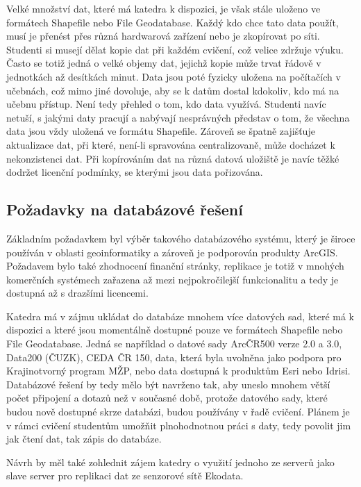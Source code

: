 Velké množství dat, které má katedra k dispozici, je však stále uloženo ve formátech Shapefile nebo File Geodatabase. Každý kdo chce tato data použít, musí je přenést přes různá hardwarová zařízení nebo je zkopírovat po síti. Studenti si musejí dělat kopie dat při každém cvičení, což velice zdržuje výuku. Často se totiž jedná o velké objemy dat, jejichž kopie může trvat řádově v jednotkách až desítkách minut. Data jsou poté fyzicky uložena na počítačích v učebnách, což mimo jiné dovoluje, aby se k datům dostal kdokoliv, kdo má na učebnu přístup. Není tedy přehled o tom, kdo data využívá. Studenti navíc netuší, s jakými daty pracují a nabývají nesprávných představ o tom, že všechna data jsou vždy uložená ve formátu Shapefile. Zároveň se špatně zajišťuje aktualizace dat, při které, není-li spravována centralizovaně, může docházet k nekonzistenci dat. Při kopírováním dat na různá datová uložiště je navíc těžké dodržet licenční podmínky, se kterými jsou data pořizována. 

\subsection{Požadavky na databázové řešení}
\label{kPozadavky}

Základním požadavkem byl výběr takového databázového systému, který je široce používán v oblasti geoinformatiky a zároveň je podporován produkty ArcGIS. Požadavem bylo také zhodnocení finanční stránky, replikace je totiž v mnohých komerčních systémech zařazena až mezi nejpokročilejší funkcionalitu a tedy je dostupná až s drazšími licencemi. 

Katedra má v zájmu ukládat do databáze mnohem více datových sad, které má k dispozici a které jsou momentálně dostupné pouze ve formátech Shapefile nebo File Geodatabase. Jedná se například o datové sady ArcČR500 verze 2.0 a 3.0, Data200 (ČUZK), CEDA ČR 150, data, která byla uvolněna jako podpora pro Krajinotvorný program MŽP, nebo data dostupná k produktům Esri nebo Idrisi. Databázové řešení by tedy mělo být navrženo tak, aby uneslo mnohem větší počet připojení a dotazů než v současné době, protože datového sady, které budou nově dostupné skrze databázi, budou používány v řadě cvičení. Plánem je v rámci cvičení studentům umožňit plnohodnotnou práci s daty, tedy povolit jim jak čtení dat, tak zápis do databáze. 

Návrh by měl také zohlednit zájem katedry o využití jednoho ze serverů jako slave server pro replikaci dat ze senzorové sítě Ekodata. 

